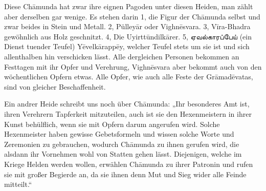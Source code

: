 \documentclass{article}
\newcommand{\TamilText}[1]{\texttamil{#1}}
\newcommand{\tam}[1]{\TamilText{#1}}
\begin{document}
Diese Ch\={a}munda hat zwar ihre eignen Pagoden unter diesen Heiden, man zählt aber derselben gar wenige. Es stehen darin 1, die Figur der Ch\={a}munda selbst und zwar beides in Stein und Metall. 2, Pülley\={a}r oder Vighn\={e}svara. 3, V\={i}ra-Bhadra gewöhnlich aus Holz geschnitzt. 4, Die Uyirtt\={u}ndilk\={a}rer. 5, \tam{ஏவல்காரப்பேய்} (ein Dienst tuender Teufel) Y\={e}velk\={a}rapp\={e}y, welcher Teufel stets um sie ist und sich allenthalben hin verschicken lässt. Alle dergleichen Personen bekommen an Festtagen mit ihr Opfer und Verehrung, Vighn\={e}svara aber bekommt auch von den wöchentlichen Opfern etwas. Alle Opfer, wie auch alle Feste der Gr\={a}mad\={e}vatas, sind von gleicher Beschaffenheit.

Ein andrer Heide schreibt uns noch über Ch\={a}munda: „Ihr besonderes Amt ist, ihren Verehrern Tapferkeit mitzuteilen, auch ist sie den Hexenmeistern in ihrer Kunst behülflich, wenn sie mit Opfern darum angerufen wird. Solche Hexenmeister haben gewisse Gebetsformeln und wissen solche Worte und Zeremonien zu gebrauchen, wodurch Ch\={a}munda zu ihnen gerufen wird, die alsdann ihr Vornehmen wohl von Statten gehen lässt. Diejenigen, welche im Kriege Helden werden wollen, erwählen Ch\={a}munda zu ihrer Patronin und rufen sie mit großer Begierde an, da sie ihnen denn Mut und Sieg wider alle Feinde mitteilt.“
\end{document}
